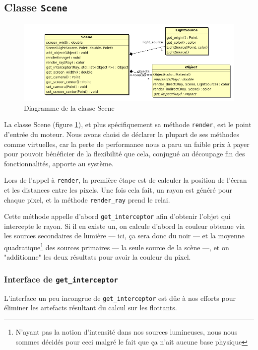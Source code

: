 \documentclass{article}
\begin{document}
\subsection{Classe \texttt{Scene}}
\begin{figure}
    \caption{Diagramme de la classe Scene}
    \label{scene}
    \begin{center}
    \includegraphics[scale=0.3]{scene.png}
    \end{center}
\end{figure}

La classe Scene (figure \ref{scene}), et plus spécifiquement sa méthode
\verb,render,, est le point d'entrée du moteur. Nous avons choisi de déclarer la plupart
de ses méthodes comme virtuelles, car la perte de performance nous a paru un faible prix
à payer pour pouvoir bénéficier de la flexibilité que cela, conjugué au découpage fin des
fonctionnalités, apporte au système.

Lors de l'appel à \verb,render,, la première étape est de calculer la position de l'écran
et les distances entre les pixels. Une fois cela fait, un rayon est généré pour chaque
pixel, et la méthode \verb,render_ray, prend le relai.

Cette méthode appelle d'abord \verb,get_interceptor, afin d'obtenir l'objet qui intercepte
le rayon. Si il en existe un, on calcule d'abord la couleur obtenue via les sources secondaires
de lumière — ici, ça sera donc du noir — et la moyenne quadratique\footnote{N'ayant pas la notion
    d'intensité dans nos sources lumineuses, nous nous sommes décidés pour ceci malgré le fait
que ça n'ait aucune base physique} des sources primaires — la seule source de la scène —, et on
"additionne" les deux résultats pour avoir la couleur du pixel.

\subsubsection{Interface de \texttt{get\_interceptor}}
L'interface un peu incongrue de \verb,get_interceptor, est dûe à nos
efforts pour éliminer les artefacts résultant du calcul sur les flottants.
\end{document}
